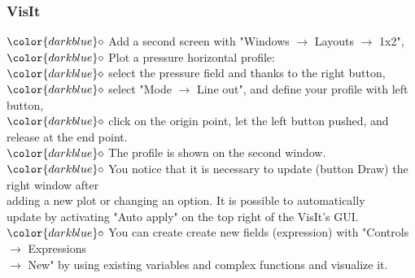 \documentclass[10pt]{beamer}
\begin{document}
\begin{frame}
\frametitle{VisIt}
\begin{block}{}

\hspace{1cm} $\color{darkblue}\circ$ {\small{Add a second screen with "Windows $\rightarrow$ Layouts $\rightarrow$ 1x2",}}\\

\hspace{1cm} $\color{darkblue}\circ$ {\small{Plot a pressure horizontal profile:\\}}
\hspace{1.5cm} $\color{darkblue}\diamond$ {\footnotesize{ select the pressure field and thanks to the right button,}} \\ 
\hspace{1.5cm} $\color{darkblue}\diamond$ {\footnotesize{ select "Mode $\rightarrow$ Line out", and define your profile with left button,}} \\
\hspace{1.5cm} $\color{darkblue}\diamond$ {\footnotesize{ click on the origin point, let the left button pushed, and release at the end point.}}\\
\hspace{1.5cm} $\color{darkblue}\diamond$ {\footnotesize{ The profile is shown on the second window.}}\\

\hspace{1cm} $\color{darkblue}\circ$ {\small{You notice that it is necessary to update (button Draw) the right window after \\
\hspace{1.3cm} adding a new plot or changing an option. It is possible to automatically \\
\hspace{1.3cm} update by activating "Auto apply" on the top right of the VisIt's GUI.}}\\

\hspace{1cm} $\color{darkblue}\circ$ {\small{You can create create new fields (expression) with "Controls $\rightarrow$ Expressions \\
\hspace{1.3cm} $\rightarrow$ New" by using existing variables and complex functions and visualize it.}}\\


\end{block}
\end{frame}
\end{document}
